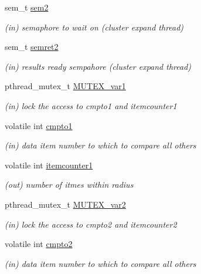 \begin{DoxyCompactItemize}
sem\+\_\+t \mbox{\hyperlink{structdbscan__pt_a5123f8b35d2933f40d493fe31dc062c5}{sem2}}
\begin{DoxyCompactList}\small\item\em (in) semaphore to wait on (cluster expand thread) \end{DoxyCompactList}\item 
sem\+\_\+t \mbox{\hyperlink{structdbscan__pt_a229860660f580c96e3f00820dedc314f}{semret2}}
\begin{DoxyCompactList}\small\item\em (in) results ready sempahore (cluster expand thread) \end{DoxyCompactList}\item 
pthread\+\_\+mutex\+\_\+t \mbox{\hyperlink{structdbscan__pt_aecd4ee021a0d72191163f578644813b4}{M\+U\+T\+E\+X\+\_\+var1}}
\begin{DoxyCompactList}\small\item\em (in) lock the access to cmpto1 and itemcounter1 \end{DoxyCompactList}\item 
volatile int \mbox{\hyperlink{structdbscan__pt_a50b8b3c19e72c2496e04595da3466fc6}{cmpto1}}
\begin{DoxyCompactList}\small\item\em (in) data item number to which to compare all others \end{DoxyCompactList}\item 
volatile int \mbox{\hyperlink{structdbscan__pt_af71b0c6290be59f918f5fded65ca5aa0}{itemcounter1}}
\begin{DoxyCompactList}\small\item\em (out) number of itmes within radius \end{DoxyCompactList}\item 
pthread\+\_\+mutex\+\_\+t \mbox{\hyperlink{structdbscan__pt_ad60703d4e4e49b5676c314ffacdd3cc6}{M\+U\+T\+E\+X\+\_\+var2}}
\begin{DoxyCompactList}\small\item\em (in) lock the access to cmpto2 and itemcounter2 \end{DoxyCompactList}\item 
volatile int \mbox{\hyperlink{structdbscan__pt_ae90fa8f34589191559422b8d49321675}{cmpto2}}
\begin{DoxyCompactList}\small\item\em (in) data item number to which to compare all others \end{DoxyCompactList}\item 

\end{DoxyCompactItemize}
